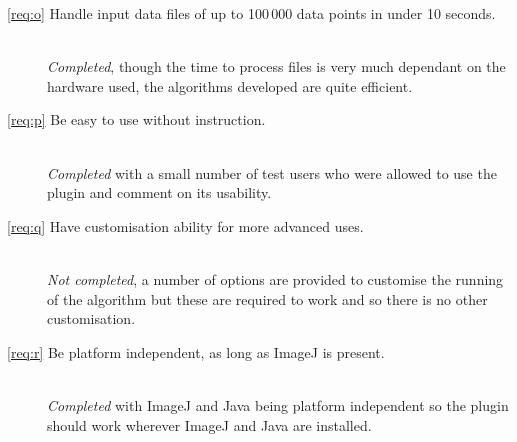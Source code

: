 \begin{description}
	\item[\ref{req:o} Handle input data files of up to 100\,000 data points in
		under 10 seconds.]
		\hfill \\ \emph{Completed}, though the time to process files is very
		much dependant on the hardware used, the algorithms developed are quite
		efficient.

	\item[\ref{req:p} Be easy to use without instruction.]
		\hfill \\ \emph{Completed} with a small number of test users who were
		allowed to use the plugin and comment on its usability.

	\item[\ref{req:q} Have customisation ability for more advanced uses.]
		\hfill \\ \emph{Not completed}, a number of options are provided to
		customise the running of the algorithm but these are required to work
		and so there is no other customisation.

	\item[\ref{req:r} Be platform independent, as long as ImageJ is
		present.]
		\hfill \\ \emph{Completed} with ImageJ and Java being platform
		independent so the plugin should work wherever ImageJ and Java are
		installed.
\end{description}
